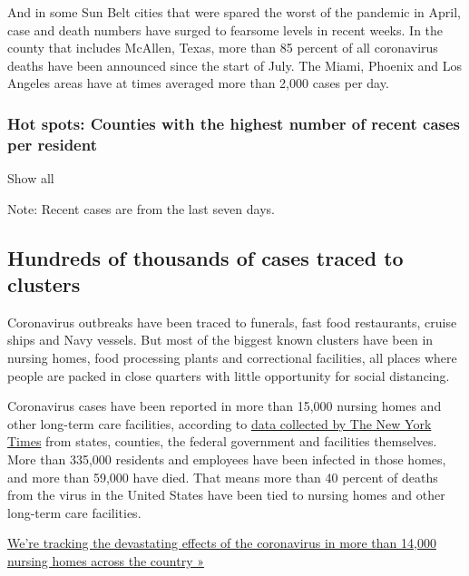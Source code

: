 And in some Sun Belt cities that were spared the worst of the pandemic
in April, case and death numbers have surged to fearsome levels in
recent weeks. In the county that includes McAllen, Texas, more than 85
percent of all coronavirus deaths have been announced since the start of
July. The Miami, Phoenix and Los Angeles areas have at times averaged
more than 2,000 cases per day.

\hypertarget{hot-spots-counties-with-the-highest-number-of-recent-cases-per-resident}{%
\subsubsection{Hot spots: Counties with the highest number of recent
cases per
resident}\label{hot-spots-counties-with-the-highest-number-of-recent-cases-per-resident}}

Show all

Note: Recent cases are from the last seven days.

\hypertarget{hundreds-of-thousands-of-cases-traced-to-clusters}{%
\subsection{Hundreds of thousands of cases traced to
clusters}\label{hundreds-of-thousands-of-cases-traced-to-clusters}}

Coronavirus outbreaks have been traced to funerals, fast food
restaurants, cruise ships and Navy vessels. But most of the biggest
known clusters have been in nursing homes, food processing plants and
correctional facilities, all places where people are packed in close
quarters with little opportunity for social distancing.

Coronavirus cases have been reported in more than 15,000 nursing homes
and other long-term care facilities, according to
\href{https://www.nytimes3xbfgragh.onion/interactive/2020/us/coronavirus-nursing-homes.html}{data
collected by The New York Times} from states, counties, the federal
government and facilities themselves. More than 335,000 residents and
employees have been infected in those homes, and more than 59,000 have
died. That means more than 40 percent of deaths from the virus in the
United States have been tied to nursing homes and other long-term care
facilities.

\href{https://www.nytimes3xbfgragh.onion/interactive/2020/us/coronavirus-nursing-homes.html}{We're
tracking the devastating effects of the coronavirus in more than 14,000
nursing homes across the country »}

